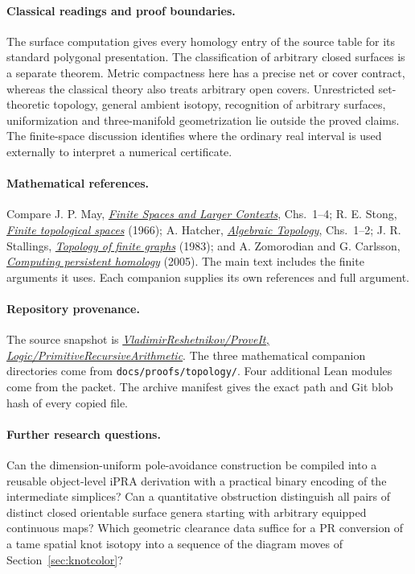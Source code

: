 \endgroup

\paragraph{Classical readings and proof boundaries.}
The surface computation gives every homology entry of the source table for its standard polygonal presentation. The classification of arbitrary closed surfaces is a separate theorem. Metric compactness here has a precise net or cover contract, whereas the classical theory also treats arbitrary open covers. Unrestricted set-theoretic topology, general ambient isotopy, recognition of arbitrary surfaces, uniformization and three-manifold geometrization lie outside the proved claims. The finite-space discussion identifies where the ordinary real interval is used externally to interpret a numerical certificate.

\paragraph{Mathematical references.}
Compare J. P. May, \href{https://math.uchicago.edu/~may/FINITE/FINITEBOOK/FINITEBOOKCollatedDraft.pdf}{\emph{Finite Spaces and Larger Contexts}}, Chs.~1--4; R. E. Stong, \href{https://doi.org/10.1090/S0002-9947-1966-0195042-2}{\emph{Finite topological spaces}} (1966); A. Hatcher, \href{https://pi.math.cornell.edu/~hatcher/AT/ATpage.html}{\emph{Algebraic Topology}}, Chs.~1--2; J. R. Stallings, \href{https://www2.math.ou.edu/~nbrady/teaching/s11-5863/stallings.pdf}{\emph{Topology of finite graphs}} (1983); and A. Zomorodian and G. Carlsson, \href{https://doi.org/10.1007/s00454-004-1146-y}{\emph{Computing persistent homology}} (2005). The main text includes the finite arguments it uses. Each companion supplies its own references and full argument.

\paragraph{Repository provenance.}
The source snapshot is \href{https://github.com/VladimirReshetnikov/ProveIt/tree/6d03f3643ebb91a6243eb1e35e7599b388197786/Logic/PrimitiveRecursiveArithmetic}{\emph{VladimirReshetnikov/ProveIt, Logic/PrimitiveRecursiveArithmetic}}. The three mathematical companion directories come from \texttt{docs/proofs/topology/}. Four additional Lean modules come from the  packet. The archive manifest gives the exact path and Git blob hash of every copied file.

\paragraph{Further research questions.}
Can the dimension-uniform pole-avoidance construction be compiled into a reusable object-level iPRA derivation with a practical binary encoding of the intermediate simplices? Can a quantitative obstruction distinguish all pairs of distinct closed orientable surface genera starting with arbitrary equipped continuous maps? Which geometric clearance data suffice for a PR conversion of a tame spatial knot isotopy into a sequence of the diagram moves of Section~\ref{sec:knotcolor}?
